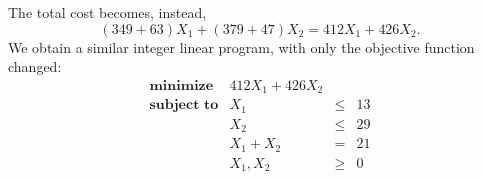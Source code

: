 \documentclass[12pt]{article}
\theoremstyle{definition}
\begin{document}
The total cost becomes, instead,
\[
    (349 + 63)X_1 + (379 + 47)X_2 = 412X_1 + 426X_2.
\]
We obtain a similar integer linear program, with only the objective function changed:
\[
    \begin{array}{lrcr}
        \textbf{minimize}   & 412X_1 + 426X_2 & & \\
        \textbf{subject to} & X_1 & \leq & 13 \\
                            & X_2 & \leq & 29 \\
                            & X_1 + X_2 & = & 21 \\
                            & X_1, X_2 & \geq & 0 \\
    \end{array}
\]
\end{document}
